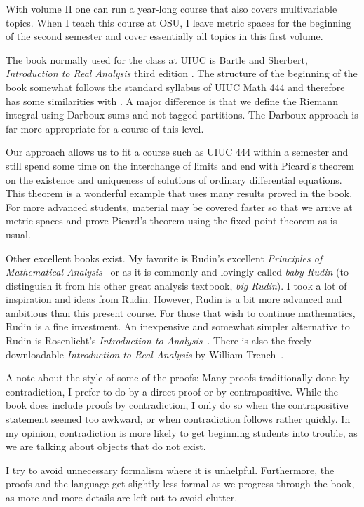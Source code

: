 With volume II one can run a year-long course that also covers multivariable
topics.  When I teach this course at OSU, I leave
metric spaces for the beginning of the
second semester and cover essentially all topics in this
first volume.

The book normally used for the class at UIUC is Bartle and Sherbert,
\emph{Introduction to Real Analysis} third edition
\cite{BS}.
The structure of the beginning of the book somewhat follows the
standard syllabus of UIUC Math 444 and therefore has some similarities with
\cite{BS}.
A major difference is that we define the Riemann integral using
Darboux sums and not tagged partitions.  The Darboux approach is far more
appropriate for a course of this level.

Our approach allows us to fit a course such as UIUC 444 within a semester
and still spend some time on the interchange of limits and end with
Picard's theorem on the existence and uniqueness of solutions of ordinary
differential equations.
This theorem is a wonderful example
that uses many results proved in the book.  For more advanced students,
material may be covered faster so that we arrive at metric spaces and
prove Picard's theorem using the fixed point theorem as is usual.

Other excellent books exist.  My favorite is 
Rudin's excellent
\emph{Principles of Mathematical Analysis}~\cite{Rudin:baby}
or as it is commonly and lovingly called \emph{baby Rudin}
(to distinguish it from his other great analysis textbook,
\emph{big Rudin}).  I took a
lot of inspiration and ideas from Rudin.  However, Rudin is a bit more
advanced and ambitious than this present course.
For those that wish to continue
mathematics, Rudin is a fine investment.
An inexpensive and somewhat simpler alternative to Rudin is
Rosenlicht's \emph{Introduction to Analysis}~\cite{Rosenlicht}.
There is also the freely downloadable \emph{Introduction to Real
Analysis} by William Trench~\cite{Trench}.

\medskip

A note about the style of some of the proofs:  Many proofs
traditionally done by contradiction, I prefer to do by
a direct proof or by contrapositive.  While the book does include
proofs by contradiction, I only
do so when the contrapositive statement seemed too awkward, or when 
contradiction follows rather quickly.  In my opinion,
contradiction is more likely to get beginning students into trouble,
as we are talking about objects that do not exist.

I try to avoid unnecessary formalism where it is unhelpful.
Furthermore, the proofs and the language get slightly less formal as we
progress through the book, as more and more details are left out to avoid
clutter.

